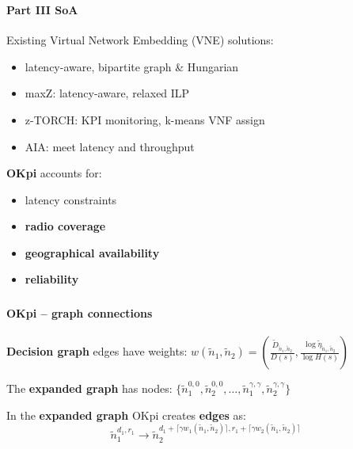 \documentclass[aspectratio=169]{beamer}
\begin{document}
\begin{frame}
    \frametitle{\secname}
    \framesubtitle{Part III SoA}

    Existing Virtual Network Embedding (VNE) solutions:
    \begin{itemize}
        \item latency-aware, bipartite graph \& Hungarian \cite{getting-the-most}
        \item maxZ: latency-aware, relaxed ILP~\cite{maxZ}
        \item z-TORCH: KPI monitoring, k-means VNF assign~\cite{z-TORCH}
        \item AIA: meet latency and throughput~\cite{adaptive-interference}
    \end{itemize}
    \textbf{\color{red}OKpi} accounts for:
    \begin{itemize}
        \item latency constraints
        \item \textbf{\color{red}radio coverage}
        \item \textbf{\color{red}geographical availability}
        \item \textbf{\color{red}reliability}
    \end{itemize}
\end{frame}














\begin{frame}
    \frametitle{\secname}
    \framesubtitle{OKpi -- graph connections}

    \textbf{Decision graph} edges have weights:
    $w(\tilde{n}_1,\tilde{n}_2) = \left( \frac{\tilde{D}_{\tilde{n}_1,\tilde{n}_2}}{D(s)}, \frac{\log \tilde{\eta}_{\tilde{n}_1,\tilde{n}_2}}{\log H(s)} \right)$

    \vfill

    The \textbf{expanded graph} has nodes: $\{ \tilde{n}_1^{0,0}, \tilde{n}_2^{0,0}, \ldots, \tilde{n}_1^{\gamma,\gamma}, \tilde{n}_2^{\gamma,\gamma} \}$

    \vfill

    In the \textbf{expanded graph} OKpi creates \textbf{edges} as:
    \begin{equation}
        \tilde{n}_1^{d_1,r_1} \longrightarrow \tilde{n}_2^{d_1+\lceil \gamma w_1(\tilde{n}_1,\tilde{n}_2)\rceil, r_1+\lceil \gamma w_2(\tilde{n}_1,\tilde{n}_2)\rceil}
    \end{equation}

\end{frame}
\end{document}
